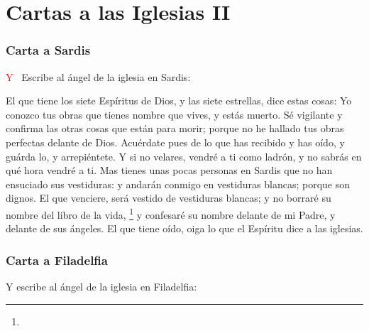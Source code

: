 \chapter{Cartas a las Iglesias II}
\subsection*{Carta a Sardis}
\lettrine[lines=3,slope=-0.5em,loversize=0.1]{\textcolor{red}{Y}}{\ } Escribe al ángel de la iglesia en Sardis:

\zz El que tiene los siete Espíritus de Dios, y las siete estrellas, dice estas cosas: Yo conozco tus obras que tienes nombre que vives, y estás muerto. %
Sé vigilante y confirma las otras cosas que están para morir; porque no he hallado tus obras perfectas delante de Dios. %
Acuérdate pues de lo que has recibido y has oído, y guárda lo, y arrepiéntete. Y si no velares, vendré a ti como ladrón, y no sabrás en qué hora vendré a ti. %
Mas tienes unas pocas personas en Sardis que no han ensuciado sus vestiduras: y andarán conmigo en vestiduras blancas; porque son dignos. %
El que venciere, será vestido de vestiduras blancas; y no borraré su nombre del libro de la vida,%
	\footnote{ %
			}
 y confesaré su nombre delante de mi Padre, y delante de sus ángeles. %
El que tiene oído, oiga lo que el Espíritu dice a las iglesias.
\subsection*{Carta a Filadelfia}
Y escribe al ángel de la iglesia en Filadelfia:

